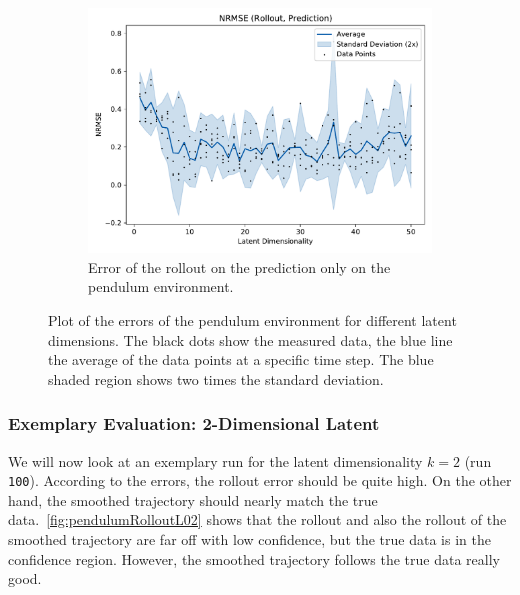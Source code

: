 \begin{figure}
\begin{subfigure}{0.5\linewidth}
					\label{fig:pendulumRmseTrain}
				\end{subfigure}%
				~
				\begin{subfigure}{0.5\linewidth}
					\centering
					\includegraphics[width=\linewidth]{figures/results/pendulum/latent-dim/comparison-rmse-rollout-prediction-normalized-mean-vs-latent-dim.pdf}
					\caption[Error of the prediction rollout on the pendulum environment]{Error of the rollout on the prediction only on the pendulum environment.}
					\label{fig:pendulumRmsePred}
				\end{subfigure}
				\caption[Errors on the pendulum environment for different latent dimensions]{Plot of the errors of the pendulum environment for different latent dimensions. The black dots show the measured data, the blue line the average of the data points at a specific time step. The blue shaded region shows two times the standard deviation.}
				\label{fig:pendulumRmse}
			\end{figure}

		\subsubsection{Exemplary Evaluation: 2-Dimensional Latent}
			We will now look at an exemplary run for the latent dimensionality \( k = 2 \) (run \texttt{100}). According to the errors, the rollout error should be quite high. On the other hand, the smoothed trajectory should nearly match the true data.~\autoref{fig:pendulumRolloutL02} shows that the rollout and also the rollout of the smoothed trajectory are far off with low confidence, but the true data is in the confidence region. However, the smoothed trajectory follows the true data really good.

